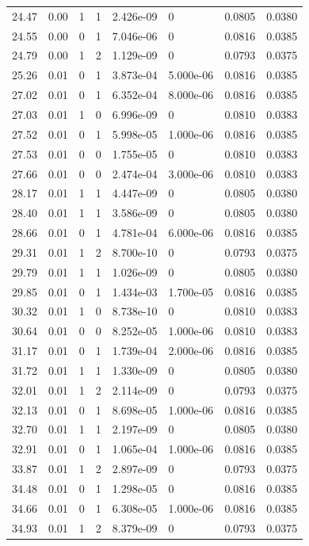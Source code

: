 \documentclass[preview]{standalone}
\begin{document}
{{{\begin{tabular}{L{1.2cm}C{1.2cm} C{0.3cm}C{0.5cm} C{1.4cm}C{1.4cm} C{1.4cm}C{1.4cm}}
  24.47  &  0.00  & 1     &  1 &  2.426e-09  & 0  & 0.0805 &  0.0380   \\ 
  24.55  &  0.00  & 0     &  1 &  7.046e-06  & 0  & 0.0816 &  0.0385   \\ 
  24.79  &  0.00  & 1     &  2 &  1.129e-09  & 0  & 0.0793 &  0.0375   \\ 
  25.26  &  0.01  & 0     &  1 &  3.873e-04  & 5.000e-06  & 0.0816 &  0.0385   \\ 
  27.02  &  0.01  & 0     &  1 &  6.352e-04  & 8.000e-06  & 0.0816 &  0.0385   \\ 
  27.03  &  0.01  & 1     &  0 &  6.996e-09  & 0  & 0.0810 &  0.0383   \\ 
  27.52  &  0.01  & 0     &  1 &  5.998e-05  & 1.000e-06  & 0.0816 &  0.0385   \\ 
  27.53  &  0.01  & 0     &  0 &  1.755e-05  & 0  & 0.0810 &  0.0383   \\ 
  27.66  &  0.01  & 0     &  0 &  2.474e-04  & 3.000e-06  & 0.0810 &  0.0383   \\ 
  28.17  &  0.01  & 1     &  1 &  4.447e-09  & 0  & 0.0805 &  0.0380   \\ 
  28.40  &  0.01  & 1     &  1 &  3.586e-09  & 0  & 0.0805 &  0.0380   \\ 
  28.66  &  0.01  & 0     &  1 &  4.781e-04  & 6.000e-06  & 0.0816 &  0.0385   \\ 
  29.31  &  0.01  & 1     &  2 &  8.700e-10  & 0  & 0.0793 &  0.0375   \\ 
  29.79  &  0.01  & 1     &  1 &  1.026e-09  & 0  & 0.0805 &  0.0380   \\ 
  29.85  &  0.01  & 0     &  1 &  1.434e-03  & 1.700e-05  & 0.0816 &  0.0385   \\ 
  30.32  &  0.01  & 1     &  0 &  8.738e-10  & 0  & 0.0810 &  0.0383   \\ 
  30.64  &  0.01  & 0     &  0 &  8.252e-05  & 1.000e-06  & 0.0810 &  0.0383   \\ 
  31.17  &  0.01  & 0     &  1 &  1.739e-04  & 2.000e-06  & 0.0816 &  0.0385   \\ 
  31.72  &  0.01  & 1     &  1 &  1.330e-09  & 0  & 0.0805 &  0.0380   \\ 
  32.01  &  0.01  & 1     &  2 &  2.114e-09  & 0  & 0.0793 &  0.0375   \\ 
  32.13  &  0.01  & 0     &  1 &  8.698e-05  & 1.000e-06  & 0.0816 &  0.0385   \\ 
  32.70  &  0.01  & 1     &  1 &  2.197e-09  & 0  & 0.0805 &  0.0380   \\ 
  32.91  &  0.01  & 0     &  1 &  1.065e-04  & 1.000e-06  & 0.0816 &  0.0385   \\ 
  33.87  &  0.01  & 1     &  2 &  2.897e-09  & 0  & 0.0793 &  0.0375   \\ 
  34.48  &  0.01  & 0     &  1 &  1.298e-05  & 0  & 0.0816 &  0.0385   \\ 
  34.66  &  0.01  & 0     &  1 &  6.308e-05  & 1.000e-06  & 0.0816 &  0.0385   \\ 
  34.93  &  0.01  & 1     &  2 &  8.379e-09  & 0  & 0.0793 &  0.0375   \\ 
\hline 
\end{tabular} 

}}}
\end{document}
